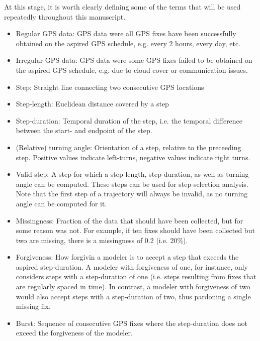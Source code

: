 \documentclass[abstract=on,10pt,a4paper,bibliography=totocnumbered]{article}
\begin{document}
At this stage, it is worth clearly defining some of the terms that will be used
repeatedly throughout this manuscript.

\begin{itemize}
  \item Regular GPS data: GPS data were all GPS fixes have been successfully
  obtained on the aspired GPS schedule, e.g. every 2 hours, every day, etc.
  \item Irregular GPS data: GPS data were some GPS fixes failed to be obtained
  on the aspired GPS schedule, e.g. due to cloud cover or communication issues.
  \item Step: Straight line connecting two consecutive GPS locations
  \item Step-length: Euclidean distance covered by a step
  \item Step-duration: Temporal duration of the step, i.e. the temporal
  difference between the start- and endpoint of the step.
  \item (Relative) turning angle: Orientation of a step, relative to the
  preceeding step. Positive values indicate left-turns, negative values indicate
  right turns.
  \item Valid step: A step for which a step-length, step-duration, as well as
  turning angle can be computed. These steps can be used for step-selection
  analysis. Note that the first step of a trajectory will always be invalid, as
  no turning angle can be computed for it.
  \item Missingness: Fraction of the data that should have been collected, but
  for some reason was not. For example, if ten fixes should have been collected
  but two are missing, there is a missingness of 0.2 (i.e. 20\%).
  \item Forgiveness: How forgivin a modeler is to accept a step that exceeds the
  aspired step-duration. A modeler with forgiveness of one, for instance, only
  considers steps with a step-duration of one (i.e. steps resulting from fixes
  that are regularly spaced in time). In contrast, a modeler with forgiveness of
  two would also accept steps with a step-duration of two, thus pardoning a
  single missing fix.
  \item Burst: Sequence of consecutive GPS fixes where the step-duration does
  not exceed the forgiveness of the modeler.
\end{itemize}
\end{document}
